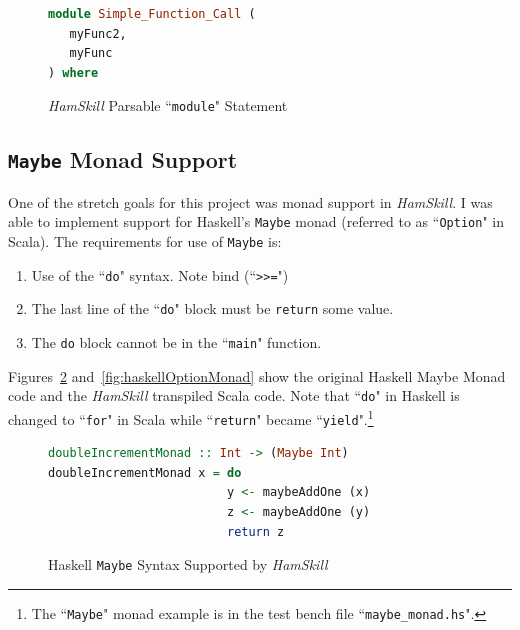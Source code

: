 \documentclass{report}
\begin{document}
\begin{figure}[H]
\begin{mdframed}
\begin{lstlisting}[language=Haskell]
module Simple_Function_Call (
   myFunc2,
   myFunc
) where
\end{lstlisting}
\end{mdframed}
\caption{\textit{HamSkill} Parsable ``\texttt{module}" Statement}\label{fig:haskellModule}
\end{figure}


\subsection{\texttt{Maybe} Monad Support}

One of the stretch goals for this project was monad support in \textit{HamSkill}.  I was able to implement support for Haskell's \texttt{Maybe} monad (referred to as ``\texttt{Option}" in Scala).  The requirements for use of \texttt{Maybe} is:

\begin{enumerate}

\item Use of the ``\texttt{do}" syntax.  Note bind (``\texttt{>>=}")

\item The last line of the ``\texttt{do}" block must be \texttt{return} some value.

\item The \texttt{do} block cannot be in the ``\texttt{main}" function.

\end{enumerate}

Figures~\ref{fig:haskellMaybeMonad} and~\ref{fig:haskellOptionMonad} show the original Haskell Maybe Monad code and the \textit{HamSkill} transpiled Scala code.  Note that ``\texttt{do}" in Haskell is changed to ``\texttt{for}" in Scala while ``\texttt{return}" became ``\texttt{yield}".\footnote{The ``\texttt{Maybe}" monad example is in the test bench file ``\texttt{maybe\_monad.hs}".}

\begin{figure}[H]
\begin{mdframed}
\begin{lstlisting}[language=Haskell]
doubleIncrementMonad :: Int -> (Maybe Int)
doubleIncrementMonad x = do
                         y <- maybeAddOne (x)
                         z <- maybeAddOne (y)
                         return z
\end{lstlisting}
\end{mdframed}
\caption{Haskell \texttt{Maybe} Syntax Supported by \textit{HamSkill}}
\label{fig:haskellMaybeMonad}
\end{figure}
\end{document}
